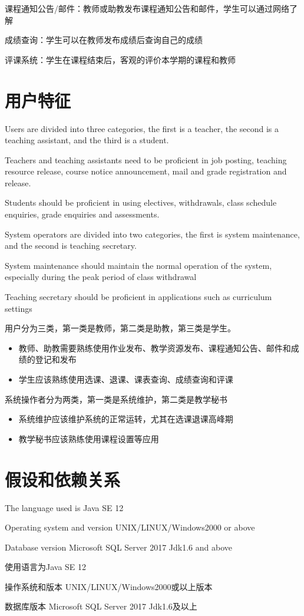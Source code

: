 课程通知公告/邮件：教师或助教发布课程通知公告和邮件，学生可以通过网络了解

成绩查询：学生可以在教师发布成绩后查询自己的成绩

评课系统：学生在课程结束后，客观的评价本学期的课程和教师

\section{用户特征}

Users are divided into three categories, the first is a teacher, the second is a teaching assistant, and the third is a student.

Teachers and teaching assistants need to be proficient in job posting, teaching resource release, course notice announcement, mail and grade registration and release.

Students should be proficient in using electives, withdrawals, class schedule enquiries, grade enquiries and assessments.

System operators are divided into two categories, the first is system maintenance, and the second is teaching secretary.

System maintenance should maintain the normal operation of the system, especially during the peak period of class withdrawal

Teaching secretary should be proficient in applications such as curriculum settings


用户分为三类，第一类是教师，第二类是助教，第三类是学生。
\begin{itemize}
\item 教师、助教需要熟练使用作业发布、教学资源发布、课程通知公告、邮件和成绩的登记和发布
\item 学生应该熟练使用选课、退课、课表查询、成绩查询和评课
\end{itemize}

系统操作者分为两类，第一类是系统维护，第二类是教学秘书
\begin{itemize}
\item 系统维护应该维护系统的正常运转，尤其在选课退课高峰期
\item 教学秘书应该熟练使用课程设置等应用
\end{itemize}


\section{假设和依赖关系}

The language used is Java SE 12

Operating system and version UNIX/LINUX/Windows2000 or above

Database version Microsoft SQL Server 2017 Jdk1.6 and above

使用语言为Java SE 12

操作系统和版本 UNIX/LINUX/Windows2000或以上版本

数据库版本 Microsoft SQL Server 2017  Jdk1.6及以上

